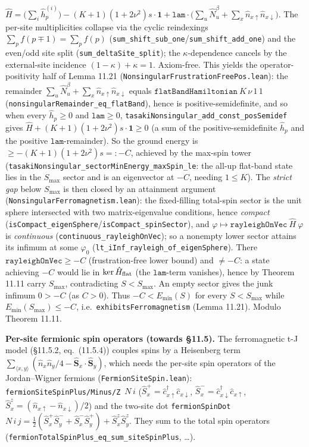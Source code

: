 \documentclass[a4paper,11pt]{article}
\begin{document}
$\hat H = \bigl(\sum_i\hat h_{p}^{(i)}\bigr) - (K{+}1)(1{+}2\nu^2)s\cdot\mathbf 1
+ \mathtt{lam}\cdot\bigl(\sum_u\hat N^\beta_u + \sum_x\hat n_{x\uparrow}\hat n_{x\downarrow}\bigr)$.
The per-site multiplicities collapse via the cyclic reindexings $\sum_p f(p\mp1)=\sum_p f(p)$
(\texttt{sum\_shift\_sub\_one}/\texttt{sum\_shift\_add\_one}) and the even/odd site split
(\texttt{sum\_deltaSite\_split}); the $\kappa$-dependence cancels by the external-site incidence
$(1-\kappa)+\kappa=1$.  Axiom-free.  This yields the operator-positivity half of Lemma 11.21
(\texttt{NonsingularFrustrationFreePos.lean}): the remainder $\sum_u\hat N^\beta_u+\sum_x\hat
n_{x\uparrow}\hat n_{x\downarrow}$ equals $\texttt{flatBandHamiltonian}~K\,\nu\,1\,1$
(\texttt{nonsingularRemainder\_eq\_flatBand}), hence is positive-semidefinite, and so when every
$\hat h_p\ge0$ and $\mathtt{lam}\ge0$, \texttt{tasakiNonsingular\_add\_const\_posSemidef} gives
$\hat H + (K{+}1)(1{+}2\nu^2)s\cdot\mathbf 1\ge 0$ (a sum of the positive-semidefinite $\hat h_p$ and
the positive $\mathtt{lam}$-remainder).  So the ground energy is $\ge -(K{+}1)(1{+}2\nu^2)s =: -C$,
achieved by the max-spin tower (\texttt{tasakiNonsingular\_sectorMinEnergy\_maxSpin\_le}: the all-up
flat-band state lies in the $S_{\max}$ sector and is an eigenvector at $-C$, needing $1\le K$).  The
\emph{strict gap} below $S_{\max}$ is then closed by an attainment argument
(\texttt{NonsingularFerromagnetism.lean}): the fixed-filling total-spin sector is the unit sphere
intersected with two matrix-eigenvalue conditions, hence \emph{compact}
(\texttt{isCompact\_eigenSphere}/\texttt{isCompact\_spinSector}), and
$\varphi\mapsto\texttt{rayleighOnVec}~\hat H~\varphi$ is \emph{continuous}
(\texttt{continuous\_rayleighOnVec}); so a nonempty lower sector attains its infimum at some
$\varphi_0$ (\texttt{lt\_iInf\_rayleigh\_of\_eigenSphere}).  There $\texttt{rayleighOnVec}\ge -C$
(frustration-free lower bound) and $\ne -C$: a state achieving $-C$ would lie in
$\ker\hat H_{\rm flat}$ (the $\mathtt{lam}$-term vanishes), hence by Theorem 11.11 carry
$S_{\max}$, contradicting $S<S_{\max}$.  An empty sector gives the junk infimum $0>-C$ (as $C>0$).
Thus $-C<E_{\min}(S)$ for every $S<S_{\max}$ while $E_{\min}(S_{\max})\le-C$, i.e.\
\texttt{exhibitsFerromagnetism} (Lemma 11.21).  Modulo Theorem 11.11.

\medskip\noindent\textbf{Per-site fermionic spin operators (towards §11.5).}  The
ferromagnetic t-J model (§11.5.2, eq.~(11.5.4)) couples spins by a Heisenberg term
$\sum_{\langle x,y\rangle}(\hat n_x\hat n_y/4 - \hat{\mathbf S}_x\cdot\hat{\mathbf S}_y)$, which
needs the per-site spin operators of the Jordan--Wigner fermions
(\texttt{FermionSiteSpin.lean}): \texttt{fermionSiteSpinPlus/Minus/Z}~$N\,i$
($\hat S^+_x=\hat c^\dagger_{x\uparrow}\hat c_{x\downarrow}$, $\hat S^-_x=\hat c^\dagger_{x\downarrow}\hat c_{x\uparrow}$,
$\hat S^z_x=(\hat n_{x\uparrow}-\hat n_{x\downarrow})/2$) and the two-site dot
\texttt{fermionSpinDot}~$N\,i\,j = \tfrac12(\hat S^+_x\hat S^-_y+\hat S^-_x\hat S^+_y)+\hat S^z_x\hat S^z_y$.
They sum to the total spin operators (\texttt{fermionTotalSpinPlus\_eq\_sum\_siteSpinPlus}, …).
\end{document}
